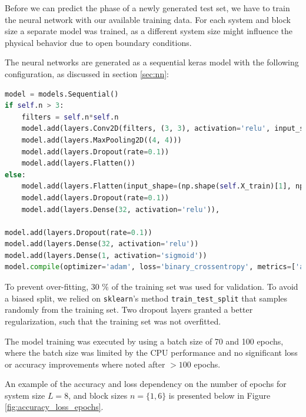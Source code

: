 \documentclass[reprint,amsmath,amssymb,aps,prb]{revtex4-2}
\begin{document}
Before we can predict the phase of a newly generated test set, we have to train the neural network with our available training data. For each system and block size a separate model was trained, as a different system size might influence the physical behavior due to open boundary conditions.

The neural networks are generated as a sequential keras model with the following configuration, as discussed in section \ref{sec:nn}: 
\begin{lstlisting}[language=Python]
model = models.Sequential()
if self.n > 3:
	filters = self.n*self.n
	model.add(layers.Conv2D(filters, (3, 3), activation='relu', input_shape=(np.shape(self.X_train[0])[0], np.shape(self.X_train[0])[1], 2)))
	model.add(layers.MaxPooling2D((4, 4)))
	model.add(layers.Dropout(rate=0.1))
	model.add(layers.Flatten())
else:
	model.add(layers.Flatten(input_shape=(np.shape(self.X_train)[1], np.shape(self.X_train)[1], 2)))
	model.add(layers.Dropout(rate=0.1))
	model.add(layers.Dense(32, activation='relu')),

model.add(layers.Dropout(rate=0.1))
model.add(layers.Dense(32, activation='relu'))
model.add(layers.Dense(1, activation='sigmoid'))
model.compile(optimizer='adam', loss='binary_crossentropy', metrics=['accuracy'])
\end{lstlisting}

To prevent over-fitting, $30$ \% of the training set was used for validation. To avoid a biased split, we relied on \texttt{sklearn}'s method \texttt{train\_test\_split} that samples randomly from the training set. Two dropout layers granted a better regularization, such that the training set was not overfitted.
	
The model training was executed by using a batch size of 70 and 100 epochs, where the batch size was limited by the CPU performance and no significant loss or accuracy improvements where noted after $>100$ epochs.

An example of the accuracy and loss dependency on the number of epochs for system size $L=8$, and block sizes $n=\{1, 6\}$ is presented below in Figure \ref{fig:accuracy_loss_epochs}.
\end{document}

